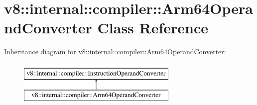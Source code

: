 \hypertarget{classv8_1_1internal_1_1compiler_1_1Arm64OperandConverter}{}\section{v8\+:\+:internal\+:\+:compiler\+:\+:Arm64\+Operand\+Converter Class Reference}
\label{classv8_1_1internal_1_1compiler_1_1Arm64OperandConverter}
Inheritance diagram for v8\+:\+:internal\+:\+:compiler\+:\+:Arm64\+Operand\+Converter\+:\begin{figure}[H]
\begin{center}
\leavevmode
\includegraphics[height=2.000000cm]{classv8_1_1internal_1_1compiler_1_1Arm64OperandConverter}
\end{center}
\end{figure}
